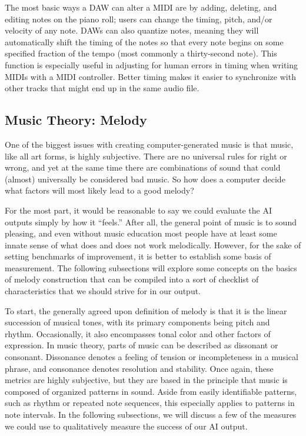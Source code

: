 The most basic ways a DAW can alter a MIDI are by adding, deleting, and editing notes on
the piano roll; users can change the timing, pitch, and/or velocity of any note. DAWs can
also quantize notes, meaning they will automatically shift the timing of the notes so that
every note begins on some specified fraction of the tempo (most commonly a thirty-second
note). This function is especially useful in adjusting for human errors in timing when
writing MIDIs with a MIDI controller. Better timing makes it easier to synchronize with
other tracks that might end up in the same audio file.

\subsection{Music Theory: Melody}
\label{sec:theory}

One of the biggest issues with creating computer-generated music is that music, like all art
forms, is highly subjective. There are no universal rules for right or wrong, and yet at the
same time there are combinations of sound that could (almost) universally be considered bad music.
So how does a computer decide what factors will most likely lead to a good melody?

For the most part, it would be reasonable to say we could evaluate the AI outputs simply by how it
“feels.” After all, the general point of music is to sound pleasing, and even without music
education most people have at least some innate sense of what does and does not work melodically.
However, for the sake of setting benchmarks of improvement, it is better to establish some basis of
measurement. The following subsections will explore some concepts on the basics of melody
construction that can be compiled into a sort of checklist of characteristics that we should strive
for in our output.

To start, the generally agreed upon definition of melody is that it is the linear succession
of musical tones, with its primary components being pitch and rhythm. Occasionally, it also
encompasses tonal color and other factors of expression.\autocite{melody} In music theory, parts
of music can be described as dissonant or consonant. Dissonance denotes a feeling of tension or
incompleteness in a musical phrase, and consonance denotes resolution and stability. Once again,
these metrics are highly subjective, but they are based in the principle that music is composed
of organized patterns in sound.\autocite{musiciansArithmetic} Aside from easily identifiable
patterns, such as rhythm or repeated note sequences, this especially applies to patterns in note
intervals. In the following subsections, we will discuss a few of the measures we could use to
qualitatively measure the success of our AI output.

